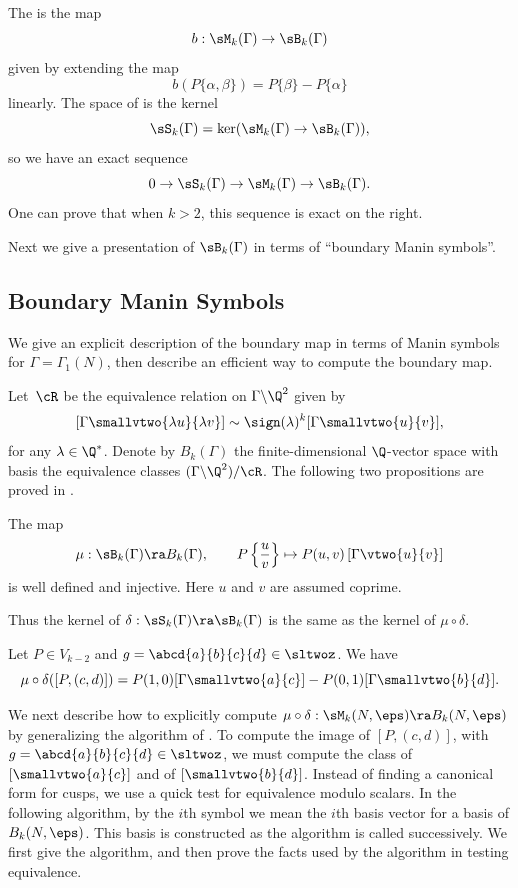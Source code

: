 The  is the map
$$
  b:\sM_k(\Gamma) \to \sB_k(\Gamma)
$$
given by extending the map
$$
  b(P\{\alpha,\beta\}) = P\{\beta\} - P\{\alpha\}
$$
linearly.
The space  of 
is the kernel
$$
  \sS_k(\Gamma) = \ker(\sM_k(\Gamma) \to \sB_k(\Gamma)),
$$
so we have an exact sequence
$$
  0 \to \sS_k(\Gamma) \to \sM_k(\Gamma) \to \sB_k(\Gamma).
$$
One can prove that when $k>2$,
this sequence is exact on the right.  

Next we give a presentation of $\sB_k(\Gamma)$ in terms of
``boundary Manin symbols''. 


\subsection{Boundary Manin Symbols}%
\label{sec:computeboundary}%
%
%
%
%

We give an explicit description of the boundary
map in terms of Manin symbols for 
$\Gamma=\Gamma_1(N)$, then describe an
efficient way to compute the boundary map.

Let~$\cR$ be the equivalence relation 
on $\Gamma\backslash\Q^2$ given by
$$
 [\Gamma\smallvtwo{\lambda u}{\lambda v}] \sim   
  \sign(\lambda)^k[\Gamma\smallvtwo{u}{v}],
$$
for any $\lambda\in\Q^*$.  Denote by $B_k(\Gamma)$
the finite-dimensional $\Q$-vector space
with basis the equivalence classes
$(\Gamma\backslash\Q^2)/\cR$. 
The following two propositions are proved in \cite{merel:1585}.
\begin{proposition}
The map
$$\mu:\sB_k(\Gamma)\ra B_k(\Gamma),
\qquad P\left\{\frac{u}{v}\right\}\mapsto
    P(u,v)\left[\Gamma\vtwo{u}{v}\right]$$
is well defined and injective.  
Here $u$ and $v$ are assumed coprime.
\end{proposition}
Thus the kernel of $\delta:\sS_k(\Gamma)\ra \sB_k(\Gamma)$
is the same as the kernel of $\mu\circ \delta$. 
\begin{proposition}\label{prop:boundary}
Let $P\in V_{k-2}$ and $g=\abcd{a}{b}{c}{d}\in\sltwoz$.  We have
$$\mu\circ\delta([P,(c,d)])
      = P(1,0)[\Gamma\smallvtwo{a}{c}]
       -P(0,1)[\Gamma\smallvtwo{b}{d}].$$
\end{proposition}

We next describe how to explicitly compute 
$\mu\circ \delta:\sM_k(N,\eps)\ra B_k(N,\eps)$
by generalizing the algorithm of \cite[\S2.2]{cremona:algs}.
To compute the image of $[P,(c,d)]$, with 
$g=\abcd{a}{b}{c}{d}\in\sltwoz$,
we must compute the class of $[\smallvtwo{a}{c}]$ and of 
$[\smallvtwo{b}{d}]$.
Instead of finding a canonical form for cusps, we 
use a quick test for equivalence modulo scalars. 
In the following algorithm, by the $i$th 
symbol we mean
the $i$th basis vector for a basis of $B_k(N,\eps)$.  This
basis is constructed as the algorithm is called successively.
We first give the algorithm, and then prove the facts
used by the algorithm in testing equivalence.


